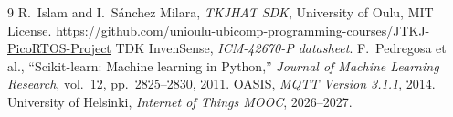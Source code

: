 \documentclass{article}
\begin{document}
\begin{thebibliography}{9}
 R.~Islam and I.~S\'anchez Milara, \emph{TKJHAT SDK}, University of Oulu, MIT License. \url{https://github.com/unioulu-ubicomp-programming-courses/JTKJ-PicoRTOS-Project}
 TDK InvenSense, \emph{ICM-42670-P datasheet}.
 F.~Pedregosa et al., ``Scikit-learn: Machine learning in Python,'' \emph{Journal of Machine Learning Research}, vol.~12, pp.~2825--2830, 2011.
 OASIS, \emph{MQTT Version 3.1.1}, 2014.
 University of Helsinki, \emph{Internet of Things MOOC}, 2026--2027.
\end{thebibliography}
\end{document}
